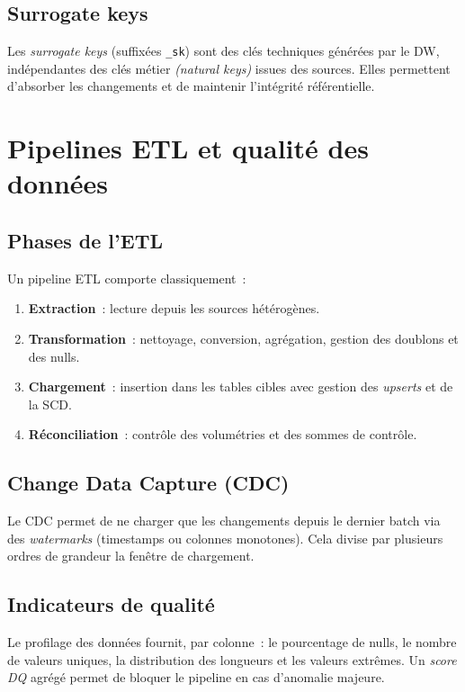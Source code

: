 \documentclass[12pt, a4paper]{report}
\begin{document}
\subsection{Surrogate keys}
Les \emph{surrogate keys} (suffixées \texttt{\_sk}) sont des clés
techniques générées par le \ac{DW}, indépendantes des clés métier
\textit{(natural keys)} issues des sources. Elles permettent d'absorber
les changements et de maintenir l'intégrité référentielle.

\section{Pipelines ETL et qualité des données}

\subsection{Phases de l'ETL}
Un pipeline \ac{ETL} comporte classiquement~:
\begin{enumerate}
  \item \textbf{Extraction}~: lecture depuis les sources hétérogènes.
  \item \textbf{Transformation}~: nettoyage, conversion, agrégation,
        gestion des doublons et des nulls.
  \item \textbf{Chargement}~: insertion dans les tables cibles avec
        gestion des \emph{upserts} et de la \ac{SCD}.
  \item \textbf{Réconciliation}~: contrôle des volumétries et des
        sommes de contrôle.
\end{enumerate}

\subsection{Change Data Capture (CDC)}
Le \ac{CDC} permet de ne charger que les changements depuis le dernier
batch via des \emph{watermarks} (timestamps ou colonnes monotones).
Cela divise par plusieurs ordres de grandeur la fenêtre de
chargement.

\subsection{Indicateurs de qualité}
Le profilage des données fournit, par colonne~: le pourcentage de nulls,
le nombre de valeurs uniques, la distribution des longueurs et les
valeurs extrêmes. Un \emph{score \ac{DQ}} agrégé permet de bloquer
le pipeline en cas d'anomalie majeure.
\end{document}
